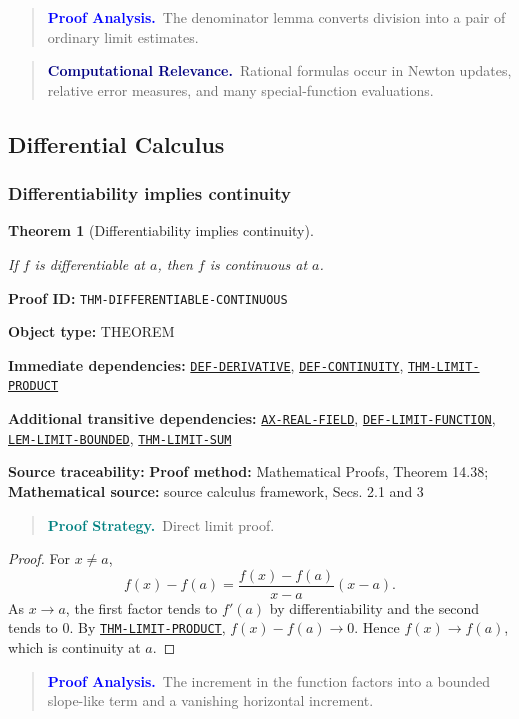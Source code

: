 \documentclass[10pt]{article}
\newcommand{\pidraw}[1]{\begingroup\urlstyle{tt}\nolinkurl{#1}\endgroup}
\newcommand{\pidref}[1]{\hyperref[prf:#1]{\pidraw{#1}}}
\newcommand{\pid}[1]{\pidref{#1}}
\newtheorem{theorem}{Theorem}[section]
\theoremstyle{definition}
\theoremstyle{remark}
\newenvironment{proofstrategy}
{\begin{quote}\small\noindent\textbf{\textcolor{teal}{Proof Strategy.}}\ }
{\end{quote}}
\newenvironment{proofanalysis}
{\begin{quote}\small\noindent\textbf{\textcolor{blue}{Proof Analysis.}}\ }
{\end{quote}}
\newenvironment{computationalrelevance}
{\begin{quote}\small\noindent\textbf{\textcolor{navy}{Computational Relevance.}}\ }
{\end{quote}}
\newcommand{\meta}[2]{\noindent\textbf{#1:} #2\par}
\begin{document}
\begin{proofanalysis}The denominator lemma converts division into a pair of ordinary limit estimates.\end{proofanalysis}

\begin{computationalrelevance}Rational formulas occur in Newton updates, relative error measures, and many special-function evaluations.\end{computationalrelevance}

\subsection{Differential Calculus}

\subsubsection{Differentiability implies continuity}

\begin{theorem}[Differentiability implies continuity]\label{prf:THM-DIFFERENTIABLE-CONTINUOUS}

If $f$ is differentiable at $a$, then $f$ is continuous at $a$.

\end{theorem}

\meta{Proof ID}{\pidraw{THM-DIFFERENTIABLE-CONTINUOUS}}
\meta{Object type}{THEOREM}
\meta{Immediate dependencies}{\pidref{DEF-DERIVATIVE}, \pidref{DEF-CONTINUITY}, \pidref{THM-LIMIT-PRODUCT}}
\meta{Additional transitive dependencies}{\pidref{AX-REAL-FIELD}, \pidref{DEF-LIMIT-FUNCTION}, \pidref{LEM-LIMIT-BOUNDED}, \pidref{THM-LIMIT-SUM}}
\meta{Source traceability}{\textbf{Proof method:} Mathematical Proofs, Theorem 14.38; \textbf{Mathematical source:} source calculus framework, Secs. 2.1 and 3}

\begin{proofstrategy}Direct limit proof.\end{proofstrategy}

\begin{proof}

For $x\ne a$,
\[
f(x)-f(a)=
\frac{f(x)-f(a)}{x-a}(x-a).
\]
As $x\to a$, the first factor tends to $f'(a)$ by differentiability and the
second tends to $0$. By \pid{THM-LIMIT-PRODUCT},
$f(x)-f(a)\to0$. Hence $f(x)\to f(a)$, which is continuity at $a$.

\end{proof}

\begin{proofanalysis}The increment in the function factors into a bounded slope-like term and a vanishing horizontal increment.\end{proofanalysis}
\end{document}
